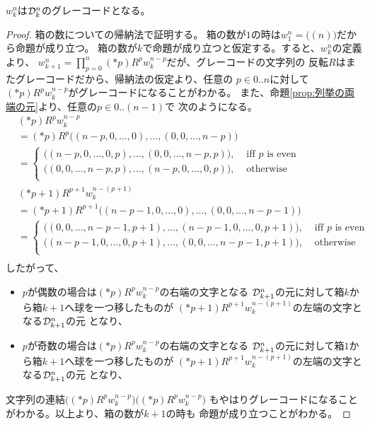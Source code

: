 	\begin{proposition}[グレーコードになる]\label{prop:グレーコードになる} %
		$w_k^n$は${\mathcal{D}}_k^n$のグレーコードとなる。
	\end{proposition} %
	\begin{proof} %
		箱の数についての帰納法で証明する。
		箱の数が$1$の時は$w_1^n=\bigl((n)\bigr)$だから命題が成り立つ。
		箱の数が$k$で命題が成り立つと仮定する。すると、$w_k^n$の定義より、
		$w_{k+1}^n=\prod_{p=0}^n(*p)R^pw_k^{n-p}$だが、グレーコードの文字列の
		反転$R$はまたグレーコードだから、帰納法の仮定より、任意の
		$p\in0..n$に対して$(*p)R^pw_k^{n-p}$がグレーコードになることがわかる。
		また、命題\ref{prop:列挙の両端の元}より、任意の$p\in0..(n-1)$で
		次のようになる。
		\begin{equation*}\begin{split} %
			&(*p)R^pw_k^{n-p} \\
			&= (*p)R^p\bigl((n-p,0,\dots,0),\dots,(0,0,\dots,n-p)\bigr) \\
			&= \begin{cases}
				\bigl((n-p,0,\dots,0,p),\dots,(0,0,\dots,n-p,p)\bigr)
					, &\text{ iff }p\text{ is even} \\
				\bigl((0,0,\dots,n-p,p),\dots,(n-p,0,\dots,0,p)\bigr)
					, &\text{ otherwise } \\
			\end{cases} \\
			&(*p+1)R^{p+1}w_k^{n-(p+1)} \\
			&= (*p+1)R^{p+1}\bigl((n-p-1,0,\dots,0),\dots,(0,0,\dots,n-p-1)\bigr) \\
			&= \begin{cases}
				\bigl((0,0,\dots,n-p-1,p+1),\dots,(n-p-1,0,\dots,0,p+1)\bigr)
					, &\text{ iff }p\text{ is even} \\
				\bigl((n-p-1,0,\dots,0,p+1),\dots,(0,0,\dots,n-p-1,p+1)\bigr)
					, &\text{ otherwise } \\
			\end{cases} \\
		\end{split}\end{equation*} %
		したがって、
		\begin{itemize}\setlength{\itemsep}{-1mm} %
			\item $p$が偶数の場合は$(*p)R^pw_k^{n-p}$の右端の文字となる
			${\mathcal{D}}_{k+1}^n$の元に対して箱$k$から箱$k+1$へ球を一つ移したものが
			$(*p+1)R^{p+1}w_k^{n-(p+1)}$の左端の文字となる${\mathcal{D}}_{k+1}^n$の元
			となり、
			\item $p$が奇数の場合は$(*p)R^pw_k^{n-p}$の右端の文字となる
			${\mathcal{D}}_{k+1}^n$の元に対して箱$1$から箱$k+1$へ球を一つ移したものが
			$(*p+1)R^{p+1}w_k^{n-(p+1)}$の左端の文字となる${\mathcal{D}}_{k+1}^n$の元
			となり、
		\end{itemize} %
		文字列の連結$\bigl((*p)R^pw_k^{n-p}\bigr)\bigl((*p)R^pw_k^{n-p}\bigr)$
		もやはりグレーコードになることがわかる。以上より、箱の数が$k+1$の時も
		命題が成り立つことがわかる。
	\end{proof} %

